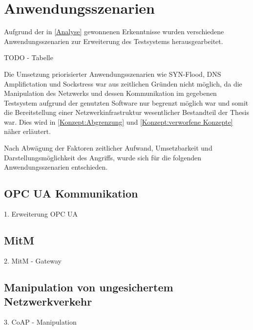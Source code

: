 \chapter{Anwendungsszenarien}
\label{Anwendungsszenarien}
Aufgrund der in \autoref{Analyse} gewonnenen Erkenntnisse wurden verschiedene Anwendungsszenarien zur Erweiterung des Testsystems herausgearbeitet.

TODO - Tabelle

Die Umsetzung priorisierter Anwendungsszenarien wie SYN-Flood, \ac{DNS} Amplifictation und Sockstress war aus zeitlichen Gründen nicht möglich, da die Manipulation des Netzwerks und dessen Kommunikation im gegebenen Testsystem aufgrund der genutzten Software nur begrenzt möglich war und somit die Bereitstellung einer Netzwerkinfrastruktur wesentlicher Bestandteil der Thesis war. Dies wird in \autoref{Konzept:Abgrenzung} und \autoref{Konzept:verworfene Konzepte} näher erläutert.

Nach Abwägung der Faktoren zeitlicher Aufwand, Umsetzbarkeit und Darstellungsmöglichkeit des Angriffs, wurde sich für die folgenden Anwendungsszenarien entschieden.

\section{\ac{OPC UA} Kommunikation}
\label{Anwendungsszenarien:OPC UA Kommunikation}
1. Erweiterung OPC UA

\section{\ac{MitM}}
\label{Anwendungsszenarien:MitM}
2. MitM - Gateway

\section{Manipulation von ungesichertem Netzwerkverkehr}
\label{Anwendungsszenarien:Manipulation von ungesichertem Netzwerkverkehr}
3. CoAP - Manipulation